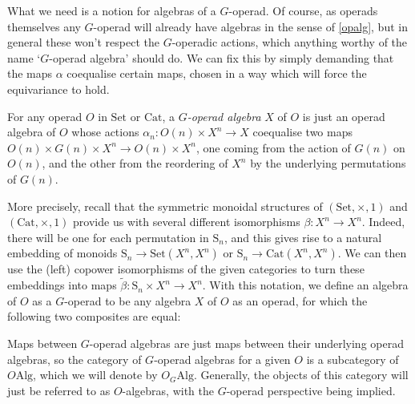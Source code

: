 What we need is a notion for algebras of a $G$-operad. Of course, as operads themselves any $G$-operad will already have algebras in the sense of \cref{opalg}, but in general these won't respect the $G$-operadic actions, which anything worthy of the name `$G$-operad algebra' should do. We can fix this by simply demanding that the maps $\alpha$ coequalise certain maps, chosen in a way which will force the equivariance to hold.

\begin{defn} \label{Gopalgdef} For any operad $O$ in $\mathrm{Set}$ or $\mathrm{Cat}$, a \emph{$G$-operad algebra} $X$ of $O$ is just an operad algebra of $O$ whose actions $\alpha_n : O(n) \times X^n \to X$ coequalise two maps $O(n) \times G(n) \times X^n \to O(n) \times X^n$, one coming from the action of $G(n)$ on $O(n)$, and the other from the reordering of $X^n$ by the underlying permutations of $G(n)$.

More precisely, recall that the symmetric monoidal structures of $(\mathrm{Set}, \times, 1)$ and $(\mathrm{Cat}, \times, 1)$ provide us with several different isomorphisms $\beta : X^n \to X^n$. Indeed, there will be one for each permutation in $\mathrm{S}_n$, and this gives rise to a natural embedding of monoids $\mathrm{S}_n \to \mathrm{Set}(X^n, X^n)$ or $\mathrm{S}_n \to \mathrm{Cat}(X^n, X^n)$. We can then use the (left) copower isomorphisms of the given categories to turn these embeddings into maps $\tilde{\beta} : \mathrm{S}_n \times X^n \to X^n$. With this notation, we define an algebra of $O$ as a $G$-operad to be any algebra $X$ of $O$ as an operad, for which the following two composites are equal:
\begin{eq*}  \end{eq*}
Maps between $G$-operad algebras are just maps between their underlying operad algebras, so the category of $G$-operad algebras for a given $O$ is a subcategory of $O\mathrm{Alg}$, which we will denote by $O_G\mathrm{Alg}$. Generally, the objects of this category will just be referred to as $O$-algebras, with the $G$-operad perspective being implied.
\end{defn}

